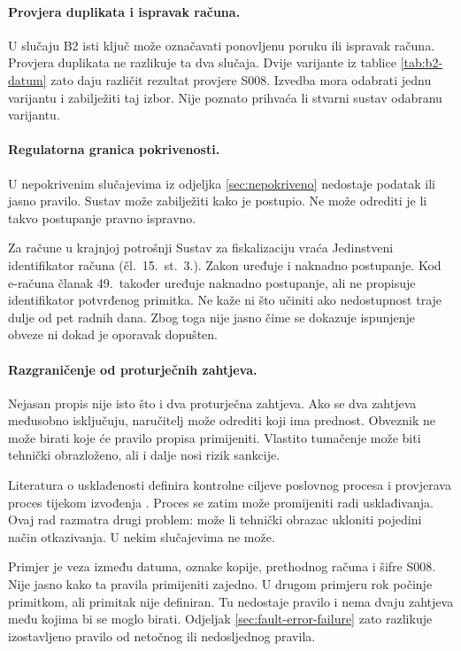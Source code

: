 \paragraph{Provjera duplikata i ispravak računa.}
U slučaju B2 isti ključ može označavati ponovljenu poruku ili ispravak računa.
Provjera duplikata ne razlikuje ta dva slučaja. Dvije varijante iz tablice
\ref{tab:b2-datum} zato daju različit rezultat provjere S008. Izvedba mora
odabrati jednu varijantu i zabilježiti taj izbor. Nije poznato prihvaća li
stvarni sustav odabranu varijantu.

\paragraph{Regulatorna granica pokrivenosti.}
U nepokrivenim slučajevima iz odjeljka \ref{sec:nepokriveno} nedostaje podatak
ili jasno pravilo. Sustav može zabilježiti kako je postupio. Ne može odrediti
je li takvo postupanje pravno ispravno.

Za račune u krajnjoj potrošnji Sustav za fiskalizaciju vraća Jedinstveni
identifikator računa (čl.~15.~st.~3.). Zakon uređuje i naknadno postupanje.
Kod e-računa članak 49.\ također uređuje naknadno postupanje, ali ne propisuje
identifikator potvrđenog primitka. Ne kaže ni što učiniti ako nedostupnost
traje dulje od pet radnih dana. Zbog toga nije jasno čime se dokazuje
ispunjenje obveze ni dokad je oporavak dopušten.

\paragraph{Razgraničenje od proturječnih zahtjeva.}
Nejasan propis nije isto što i dva proturječna zahtjeva. Ako se dva zahtjeva
međusobno isključuju, naručitelj može odrediti koji ima prednost. Obveznik ne
može birati koje će pravilo propisa primijeniti. Vlastito tumačenje može biti
tehnički obrazloženo, ali i dalje nosi rizik sankcije.

Literatura o usklađenosti definira kontrolne ciljeve poslovnog procesa
\cite{sadiq2007compliance} i provjerava proces tijekom izvođenja
\cite{ly2015compliance}. Proces se zatim može promijeniti radi usklađivanja.
Ovaj rad razmatra drugi problem: može li tehnički obrazac ukloniti pojedini
način otkazivanja. U nekim slučajevima ne može.

Primjer je veza između datuma, oznake kopije, prethodnog računa i šifre S008.
Nije jasno kako ta pravila primijeniti zajedno. U drugom primjeru rok počinje
primitkom, ali primitak nije definiran. Tu nedostaje pravilo i nema dvaju
zahtjeva među kojima bi se moglo birati. Odjeljak
\ref{sec:fault-error-failure} zato razlikuje izostavljeno pravilo od
netočnog ili nedosljednog pravila.


